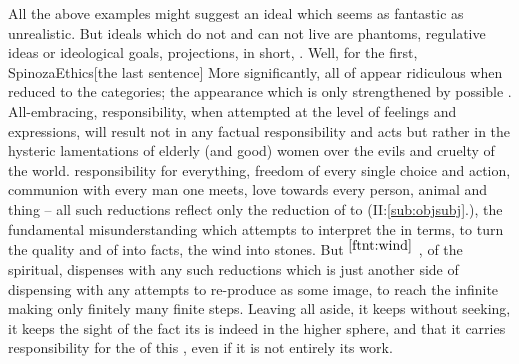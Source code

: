\pa All the above examples might suggest an ideal which seems as fantastic as
unrealistic. But ideals which do not and can not live are  phantoms,
regulative ideas or ideological goals,  projections, in short,
.  Well, for the first, \citet{[a]ll things excellent are as difficult
  as they are rare.}{SpinozaEthics}{[the last sentence]} More significantly, all
 of  appear ridiculous when
reduced to the  categories; the appearance which is only strengthened
by possible .  All-embracing,  responsibility, when
attempted at the level of  feelings and expressions, will result not
in any factual responsibility and acts but rather in the hysteric lamentations
of elderly (and good) women over the evils and cruelty of the world.
 responsibility for everything,  freedom of every single
choice and action,  communion with every man one meets, 
love towards every person, animal and thing -- all such reductions reflect only
the reduction of  to  (II:\ref{sub:objsubj}.),
the fundamental misunderstanding which attempts to interpret the 
in  terms, to turn the quality and  of  into
facts, the wind into stones. But $^{\ref{ftnt:wind}}$ ,
 of the spiritual, dispenses with any such reductions which is
just another side of dispensing with any attempts to re-produce 
as some  image, to reach the infinite making only finitely many
finite steps. Leaving all  aside, it keeps  without
seeking, it keeps the  sight of the fact  its 
is indeed  in the higher sphere, and that it carries responsibility
for the  of this , even if it is not entirely
its work.

